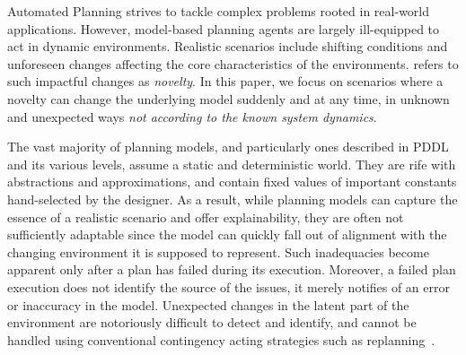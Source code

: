 \documentclass[letterpaper]{article} %
\begin{document}


Automated Planning strives to tackle complex problems rooted in real-world applications. However, model-based planning agents are largely ill-equipped to act in dynamic environments. Realistic scenarios include shifting conditions and unforeseen changes affecting the core characteristics of the environments. \citet{langley2020open} refers to such impactful changes as \emph{novelty}. In this paper, we focus on scenarios where a novelty can change the underlying model suddenly and at any time, in unknown and unexpected ways \emph{not according to the known system dynamics}. 

The vast majority of planning models, and particularly ones described in PDDL~\cite{mcdermott1998pddl} and its various levels, assume a static and deterministic world. They are rife with abstractions and approximations, and contain fixed values of important constants hand-selected by the designer. As a result, while planning models can capture the essence of a realistic scenario and offer explainability, they are often not sufficiently adaptable since the model can quickly fall out of alignment with the changing environment it is supposed to represent. Such inadequacies become apparent only after a plan has failed during its execution. Moreover, a failed plan execution does not identify the source of the issues, it merely notifies of an error or inaccuracy in the model. Unexpected changes in the latent part of the environment are notoriously difficult to detect and identify, and cannot be handled using conventional contingency acting strategies such as replanning~\cite{nebel1995plan}. 
\end{document}
